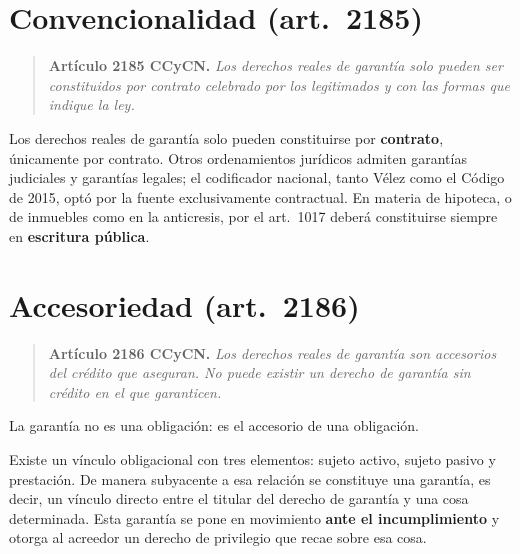\documentclass[12pt,oneside]{book}
\begin{document}

\section{Convencionalidad (art.~2185)}

\begin{quote}
\textbf{Artículo 2185 CCyCN.} \textit{Los derechos reales de garantía solo pueden ser constituidos por contrato celebrado por los legitimados y con las formas que indique la ley.}
\end{quote}

Los derechos reales de garantía solo pueden constituirse por \textbf{contrato}, únicamente por contrato. Otros ordenamientos jurídicos admiten garantías judiciales y garantías legales; el codificador nacional, tanto Vélez como el Código de 2015, optó por la fuente exclusivamente contractual. En materia de hipoteca, o de inmuebles como en la anticresis, por el art.~1017 deberá constituirse siempre en \textbf{escritura pública}.

\section{Accesoriedad (art.~2186)}

\begin{quote}
\textbf{Artículo 2186 CCyCN.} \textit{Los derechos reales de garantía son accesorios del crédito que aseguran. No puede existir un derecho de garantía sin crédito en el que garanticen.}
\end{quote}

\begin{important}
La garantía no es una obligación: es el accesorio de una obligación.
\end{important}

Existe un vínculo obligacional con tres elementos: sujeto activo, sujeto pasivo y prestación. De manera subyacente a esa relación se constituye una garantía, es decir, un vínculo directo entre el titular del derecho de garantía y una cosa determinada. Esta garantía se pone en movimiento \textbf{ante el incumplimiento} y otorga al acreedor un derecho de privilegio que recae sobre esa cosa.
\end{document}
